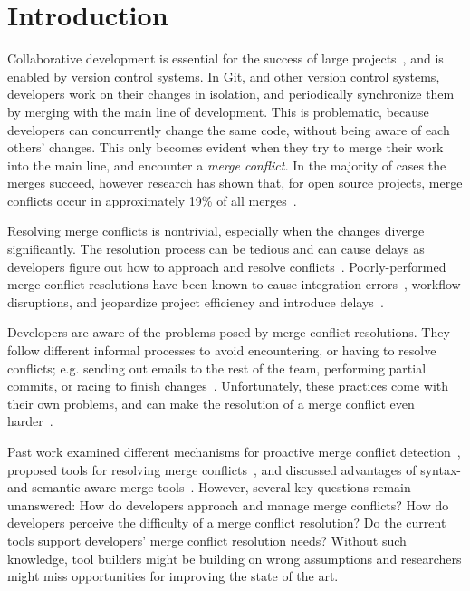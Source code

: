 
\section{Introduction}\label{introduction}

Collaborative development is essential for the success of large projects~\cite{hattori2010syde}, and is enabled by version control systems. 
In Git, and other version control systems, developers work on their changes in isolation, and periodically synchronize them by merging with the main line of development. 
This is problematic, because developers can concurrently change the same code, without being aware of each others' changes.
This only becomes evident when they try to merge their work into the main line, and encounter a \emph{merge conflict.}
In the majority of cases the merges succeed, however research has shown that, for open source projects, merge conflicts occur in approximately 19\% of all merges~\cite{cassandra,Brun2011}.

Resolving merge conflicts is nontrivial, especially when the changes diverge significantly.
The resolution process can be tedious and can cause delays as developers figure out how to approach and resolve conflicts~\cite{cassandra}. 
Poorly-performed merge conflict resolutions have been known to cause integration errors~\cite{bird-branches-conflict}, workflow disruptions, and jeopardize project efficiency and introduce delays~\cite{estler2014awareness}. 

Developers are aware of the problems posed by merge conflict resolutions.
They follow different informal processes to avoid encountering, or having to resolve conflicts; e.g. sending out emails to the rest of the team, performing partial commits, or racing to finish changes~\cite{deSouza2003breaking,cataldo2008distributed_dev}.
Unfortunately, these practices come with their own problems, and can make the resolution of a merge conflict even harder~\cite{Brun2011}. 

Past work examined different mechanisms for proactive merge conflict detection~\cite{Brun2011,palantir,Guimaraes}, proposed tools for resolving merge conflicts~\cite{nishimura,mens2002state}, and discussed advantages of syntax- and semantic-aware merge tools~\cite{danny_refactorings,hunt2002extensible,apel_semistructured_2011}. 
However, several key questions remain unanswered: 
How do developers approach and manage merge conflicts?
How do developers perceive the difficulty of a merge conflict resolution? 
Do the current tools support developers' merge conflict resolution needs?
Without such knowledge, tool builders might be building on wrong assumptions and researchers might miss opportunities for improving the state of the art.


